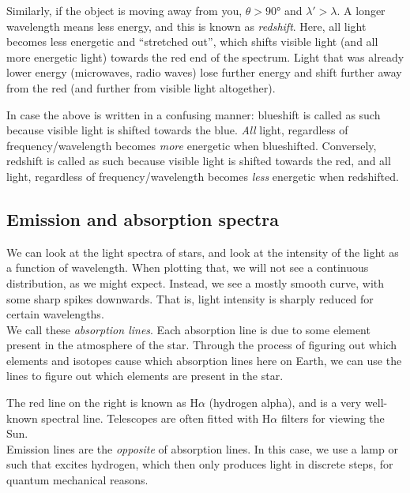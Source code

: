 Similarly, if the object is moving away from you, $\theta > \ang{90}$ and $\lambda' > \lambda$. A longer wavelength means less energy, and this is known as \emph{redshift}. Here, all light becomes less energetic and ``stretched out'', which shifts visible light (and all more energetic light) towards the red end of the spectrum. Light that was already lower energy (microwaves, radio waves) lose further energy and shift further away from the red (and further from visible light altogether).

In case the above is written in a confusing manner: blueshift is called as such because visible light is shifted towards the blue. \emph{All} light, regardless of frequency/wavelength becomes \emph{more} energetic when blueshifted. Conversely, redshift is called as such because visible light is shifted towards the red, and all light, regardless of frequency/wavelength becomes \emph{less} energetic when redshifted.

\subsection{Emission and absorption spectra}

We can look at the light spectra of stars, and look at the intensity of the light as a function of wavelength. When plotting that, we will not see a continuous distribution, as we might expect. Instead, we see a mostly smooth curve, with some sharp spikes downwards. That is, light intensity is sharply reduced for certain wavelengths.\\
We call these \emph{absorption lines}. Each absorption line is due to some element present in the atmosphere of the star. Through the process of figuring out which elements and isotopes cause which absorption lines here on Earth, we can use the lines to figure out which elements are present in the star.



The red line on the right is known as H$\alpha$ (hydrogen alpha), and is a very well-known spectral line. Telescopes are often fitted with H$\alpha$ filters for viewing the Sun.\\
Emission lines are the \emph{opposite} of absorption lines. In this case, we use a lamp or such that excites hydrogen, which then only produces light in discrete steps, for quantum mechanical reasons.

